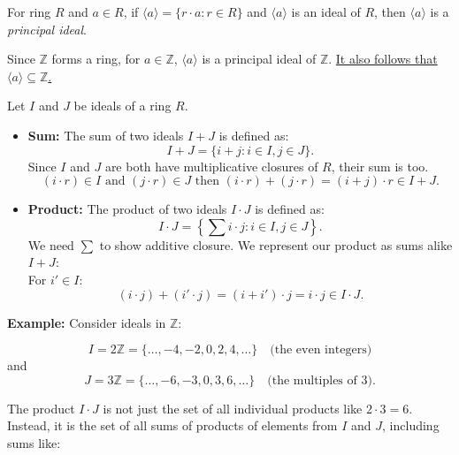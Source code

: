\begin{Def}

    For ring $R$ and $a\in R$, if $\langle a \rangle = \{ r \cdot a : r \in R \}$
    and $\langle a \rangle$ is an ideal of $R$, then $\langle a \rangle$ is a \textit{principal ideal}.
\end{Def}

\noindent
Since $\mathbb{Z}$ forms a ring, for $a\in\mathbb{Z}$, $\langle a \rangle$ is a principal ideal of $\mathbb{Z}$. \underline{It also follows that $\langle a \rangle \subseteq \mathbb{Z}$.}

\newpage

\begin{Def}

    \label{def:ideal_operations}

    Let $I$ and $J$ be ideals of a ring $R$.
    \begin{itemize}
        \item \textbf{Sum:} The sum of two ideals $I + J$ is defined as:
              \[
                  I + J = \{ i + j : i \in I, j \in J \}.
              \]
              Since $I$ and $J$ are both have multiplicative closures of $R$, their sum is too.\\
              \[
                  (i\cdot r) \in I \text{ and } (j\cdot r) \in J \text{ then } (i\cdot r) + (j\cdot r) = (i+j)\cdot r \in I+J.
              \]
        \item \textbf{Product:} The product of two ideals $I \cdot J$ is defined as:
              \[
                  I \cdot J = \left\{ \sum i \cdot j : i \in I, j \in J \right\}.
              \]
              We need $\sum$ to show additive closure. We represent
              our product as sums alike $I+J$:\\
              For $i'\in I$:
              \[
                  (i\cdot j) + (i'\cdot j) = (i+i')\cdot j = i\cdot j \in I\cdot J.
              \]

    \end{itemize}
\end{Def}

\noindent
\textbf{Example:} Consider ideals in $\mathbb{Z}$:

\[
    I = 2\mathbb{Z} = \{ \ldots, -4, -2, 0, 2, 4, \ldots \} \quad \text{(the even integers)}
\]
and
\[
    J = 3\mathbb{Z} = \{ \ldots, -6, -3, 0, 3, 6, \ldots \} \quad \text{(the multiples of 3)}.
\]

\noindent
The product $I \cdot J$ is not just the set of all individual products like $2 \cdot 3 = 6$. Instead, it is the set of all sums of products of elements from $I$ and $J$, including sums like:

